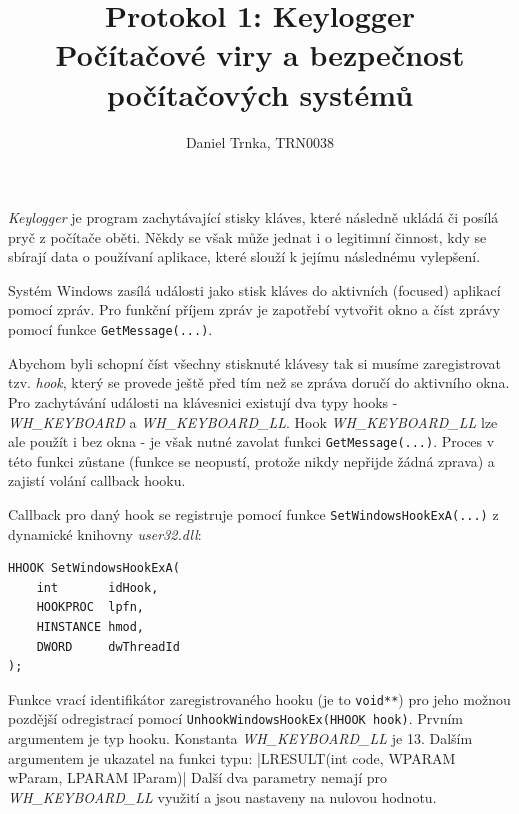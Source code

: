 \documentclass[12pt]{article}
\title{Protokol 1: Keylogger \\ Počítačové viry a bezpečnost počítačových systémů}
\author{Daniel Trnka, TRN0038}
\begin{document}
\maketitle
\clearpage


\textit{Keylogger} je program zachytávající stisky kláves, které následně ukládá či posílá pryč z počítače oběti.
Někdy se však může jednat i o legitimní činnost, kdy se sbírají data o používaní aplikace, které slouží k jejímu následnému vylepšení.


Systém Windows zasílá události jako stisk kláves do aktivních (focused) aplikací pomocí zpráv.
Pro funkční příjem zpráv je zapotřebí vytvořit okno a číst zprávy pomocí funkce \texttt{GetMessage(...)}.

Abychom byli schopní číst všechny stisknuté klávesy tak si musíme zaregistrovat tzv. \textit{hook}, který se provede ještě před tím než se zpráva doručí do aktivního okna.
Pro zachytávání události na klávesnici existují dva typy hooks - \textit{WH\_KEYBOARD} a \textit{WH\_KEYBOARD\_LL}.
Hook \textit{WH\_KEYBOARD\_LL} lze ale použít i bez okna - je však nutné zavolat funkci \texttt{GetMessage(...)}.
Proces v této funkci zůstane (funkce se neopustí, protože nikdy nepřijde žádná zprava) a zajistí volání callback hooku.

Callback pro daný hook se registruje pomocí funkce \texttt{SetWindowsHookExA(...)} z dynamické knihovny \textit{user32.dll}:

\begin{verbatim}
HHOOK SetWindowsHookExA(
	int       idHook,
	HOOKPROC  lpfn,
	HINSTANCE hmod,
	DWORD     dwThreadId
);
\end{verbatim}
Funkce vrací identifikátor zaregistrovaného hooku (je to \texttt{void**}) pro jeho možnou pozdější odregistrací pomocí \texttt{UnhookWindowsHookEx(HHOOK hook)}.
Prvním argumentem je typ hooku.
Konstanta \textit{WH\_KEYBOARD\_LL} je 13.
Dalším argumentem je ukazatel na funkci typu:
|LRESULT(int code, WPARAM wParam, LPARAM lParam)|
Další dva parametry nemají pro \textit{WH\_KEYBOARD\_LL} využití a jsou nastaveny na nulovou hodnotu.
\end{document}

